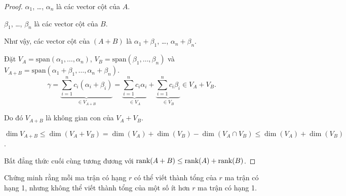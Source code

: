 \documentclass[class=linearalgebra,crop=false]{standalone}
\begin{document}
\begin{proof}
    \par $\alpha_{1}$, \ldots, $\alpha_{n}$ là các vector cột của $A$.
    \par $\beta_{1}$, \ldots, $\beta_{n}$ là các vector cột của $B$.
    \par Như vậy, các vector cột của $(A + B)$ là $\alpha_{1} + \beta_{1}$, \ldots, $\alpha_{n} + \beta_{n}$.
    \par Đặt $V_{A} = \text{span}(\alpha_{1}, \ldots, \alpha_{n})$, $V_{B} = \text{span}(\beta_{1}, \ldots, \beta_{n})$ và $V_{A+B} = \text{span}(\alpha_{1}+\beta_{1}, \ldots, \alpha_{n} + \beta_{n})$.
    \[
        \gamma = \underbrace{\sum^{n}_{i=1}c_{i}(\alpha_{i} + \beta_{i})}_{\in V_{A+B}} = \underbrace{\sum^{n}_{i=1}c_{i}\alpha_{i}}_{\in V_{A}} + \underbrace{\sum^{n}_{i=1}c_{i}\beta_{i}}_{\in V_{B}} \in V_{A} + V_{B}.
    \]
    \par Do đó $V_{A+B}$ là không gian con của $V_{A} + V_{B}$.
    \par $\dim V_{A+B}\le \dim(V_{A} + V_{B}) = \dim(V_{A}) + \dim(V_{B}) - \dim(V_{A}\cap V_{B})\le \dim(V_{A}) + \dim(V_{B})$.
    \par Bất đẳng thức cuối cùng tương đương với $\text{rank}(A + B)\le \text{rank}(A) + \text{rank}(B)$.
\end{proof}

\begin{exercise}
    \par Chứng minh rằng mỗi ma trận có hạng $r$ có thể viết thành tổng của $r$ ma trận có hạng 1, nhưng không thể viết thành tổng của một số ít hơn $r$ ma trận có hạng 1.
\end{exercise}
\end{document}

